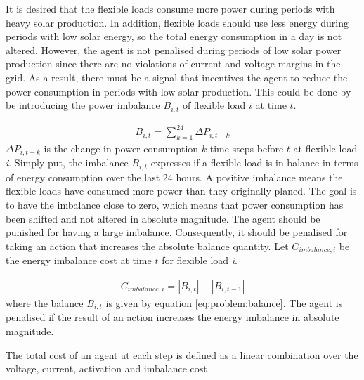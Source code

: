 \documentclass[class=book, crop=false]{standalone}
\begin{document}
It is desired that the flexible loads consume more power during periods with heavy solar production. In addition, flexible loads should use less energy during periods with low solar energy, so the total energy consumption in a day is not altered. However, the agent is not penalised during periods of low solar power production since there are no violations of current and voltage margins in the grid. As a result, there must be a signal that incentives the agent to reduce the power consumption in periods with low solar production. This could be done by be introducing the power imbalance $B_{i,t}$ of flexible load $i$ at time $t$.

\begin{equation}
   \begin{aligned}
   \label{eq:problem:balance}
    B_{i,t} = \sum_{k=1}^{24}\Delta P_{i,t-k}
    \end{aligned} 
\end{equation}
$\Delta P_{i,t-k}$ is the change in power consumption $k$ time steps before $t$ at flexible load \textit{i}. Simply put, the imbalance $B_{i,t}$ expresses if a flexible load is in balance in terms of energy consumption over the last 24 hours. A positive imbalance means the flexible loads have consumed more power than they originally planed. The goal is to have the imbalance close to zero, which means that power consumption has been shifted and not altered in absolute magnitude. The agent should be punished for having a large imbalance. Consequently, it should be penalised for taking an action that increases the absolute balance quantity. Let $C_{imbalance,i}$ be the energy imbalance cost at time $t$ for flexible load \textit{i}.

\begin{equation}
   \begin{aligned}
   \label{eq:problem:balance_cost}
    C_{imbalance,i} = |B_{i,t}| - |B_{i,t-1}|
    \end{aligned} 
\end{equation}
where the balance $B_{i,t}$ is given by equation \eqref{eq:problem:balance}. The agent is penalised if the result of an action increases the energy imbalance in absolute magnitude.  

The total cost of an agent at each step is defined as a linear combination over the voltage, current, activation and imbalance cost 
\end{document}
